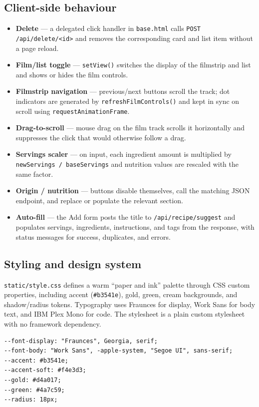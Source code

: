 \documentclass[11pt,a4paper]{article}
\newcommand{\code}[1]{\texttt{#1}}
\begin{document}
\subsection{Client-side behaviour}
\begin{itemize}[nosep]
  \item \textbf{Delete} --- a delegated click handler in \code{base.html} calls
        \code{POST /api/delete/<id>} and removes the corresponding card and list
        item without a page reload.
  \item \textbf{Film/list toggle} --- \code{setView()} switches the display of
        the filmstrip and list and shows or hides the film controls.
  \item \textbf{Filmstrip navigation} --- previous/next buttons scroll the
        track; dot indicators are generated by \code{refreshFilmControls()} and
        kept in sync on scroll using \code{requestAnimationFrame}.
  \item \textbf{Drag-to-scroll} --- mouse drag on the film track scrolls it
        horizontally and suppresses the click that would otherwise follow a
        drag.
  \item \textbf{Servings scaler} --- on input, each ingredient amount is
        multiplied by \code{newServings / baseServings} and nutrition values are
        rescaled with the same factor.
  \item \textbf{Origin / nutrition} --- buttons disable themselves, call the
        matching JSON endpoint, and replace or populate the relevant section.
  \item \textbf{Auto-fill} --- the Add form posts the title to
        \code{/api/recipe/suggest} and populates servings, ingredients,
        instructions, and tags from the response, with status messages for
        success, duplicates, and errors.
\end{itemize}

\subsection{Styling and design system}
\code{static/style.css} defines a warm ``paper and ink'' palette through CSS
custom properties, including accent (\code{\#b3541e}), gold, green, cream
backgrounds, and shadow/radius tokens. Typography uses Fraunces for display,
Work Sans for body text, and IBM Plex Mono for code. The stylesheet is a plain
custom stylesheet with no framework dependency.

\begin{lstlisting}[style=txt,caption={Design tokens (excerpt)}]
--font-display: "Fraunces", Georgia, serif;
--font-body: "Work Sans", -apple-system, "Segoe UI", sans-serif;
--accent: #b3541e;
--accent-soft: #f4e3d3;
--gold: #d4a017;
--green: #4a7c59;
--radius: 18px;
\end{lstlisting}
\end{document}
